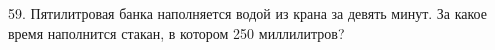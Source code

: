 59. Пятилитровая банка наполняется водой из крана за девять минут. За какое время наполнится стакан, в котором 250 миллилитров?\\
